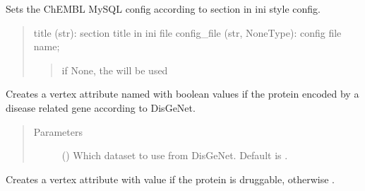 \documentclass[letterpaper,10pt,english]{sphinxmanual}
\begin{document}
\begin{fulllineitems}
\begin{fulllineitems}
\end{fulllineitems}


\begin{fulllineitems}
\label{\detokenize{main:pypath.main.PyPath.set_chembl_mysql}}
Sets the ChEMBL MySQL config according to
 section in  ini style config.
\begin{quote}

title (str): section title in ini file
config\_file (str, NoneType): config file name;
\begin{quote}

if None, the 
will be used
\end{quote}
\end{quote}

\end{fulllineitems}


\begin{fulllineitems}
\label{\detokenize{main:pypath.main.PyPath.set_disease_genes}}
Creates a vertex attribute named  with boolean values 
if the protein encoded by a disease related gene according to
DisGeNet.
\begin{quote}\begin{description}
\item[{Parameters}] \leavevmode
{} () \textendash{} Which dataset to use from DisGeNet. Default is .

\end{description}\end{quote}

\end{fulllineitems}


\begin{fulllineitems}
\label{\detokenize{main:pypath.main.PyPath.set_druggability}}
Creates a vertex attribute  with value  if
the protein is druggable, otherwise .


\end{fulllineitems}
\end{fulllineitems}
\end{document}
